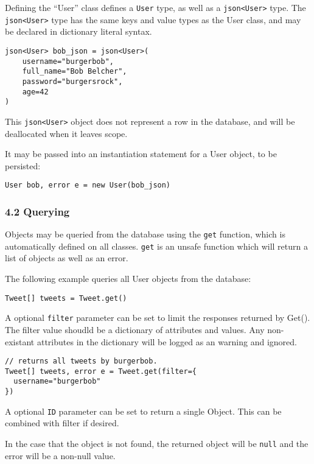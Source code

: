 Defining the ``User'' class defines a \texttt{User} type, as well as a
\texttt{json\textless{}User\textgreater{}} type. The
\texttt{json\textless{}User\textgreater{}} type has the same keys and
value types as the User class, and may be declared in dictionary literal
syntax.

\begin{verbatim}
json<User> bob_json = json<User>(
    username="burgerbob",
    full_name="Bob Belcher",
    password="burgersrock",
    age=42
)
\end{verbatim}

This \texttt{json\textless{}User\textgreater{}} object does not
represent a row in the database, and will be deallocated when it leaves
scope.

It may be passed into an instantiation statement for a User object, to
be persisted:

\begin{verbatim}
User bob, error e = new User(bob_json)
\end{verbatim}

\subsubsection{4.2 Querying}\label{querying}

Objects may be queried from the database using the \texttt{get}
function, which is automatically defined on all classes. \texttt{get} is
an unsafe function which will return a list of objects as well as an
error.

The following example queries all User objects from the database:

\begin{verbatim}
Tweet[] tweets = Tweet.get()
\end{verbatim}

A optional \texttt{filter} parameter can be set to limit the responses
returned by Get(). The filter value shoudld be a dictionary of
attributes and values. Any non-existant attributes in the dictionary
will be logged as an warning and ignored.

\begin{verbatim}
// returns all tweets by burgerbob.
Tweet[] tweets, error e = Tweet.get(filter={
  username="burgerbob"
})
\end{verbatim}

A optional \texttt{ID} parameter can be set to return a single Object.
This can be combined with filter if desired.

In the case that the object is not found, the returned object will be
\texttt{null} and the error will be a non-null value.

